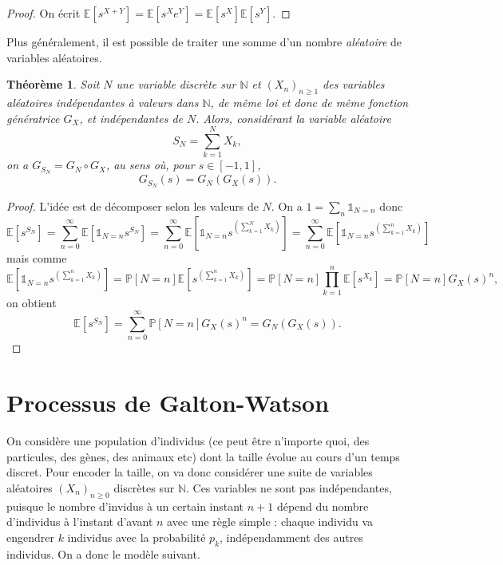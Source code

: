 \documentclass[a4paper,12pt]{book}
\newtheorem{thmfr}{Théorème}[section]
\begin{document}
\begin{proof}On écrit $\mathbb{E}[s^{X+Y}]=\mathbb{E}[s^Xe^Y]=\mathbb{E}[s^X]\mathbb{E}[s^Y]$.
\end{proof}
Plus généralement, il est possible de traiter une somme d'un nombre \emph{aléatoire} de variables aléatoires.
\begin{thmfr} Soit $N$ une variable discrète sur $\mathbb{N}$ et $(X_n)_{n\geq 1}$ des variables aléatoires indépendantes à valeurs dans $\mathbb{N}$, de même loi et donc de même fonction génératrice $G_X$, et indépendantes de $N$. Alors, considérant la variable aléatoire
$$S_N=\sum_{k=1}^NX_k,$$
on a $G_{S_N}=G_N\circ G_X$, au sens où, pour $s\in [-1,1]$,
$$G_{S_N}(s)=G_N( G_X(s)) .$$
\end{thmfr}
\begin{proof}L'idée est de décomposer selon les valeurs de $N$. On a $1=\sum_n \mathds{1}_{N=n}$ donc
$$\mathbb{E}[s^{S_N}]=\sum_{n=0}^\infty \mathbb{E}[\mathds{1}_{N=n}s^{S_N}] =\sum_{n=0}^\infty \mathbb{E}\left[\mathds{1}_{N=n}s^{\left(\sum_{k=1}^NX_k\right)}\right]=\sum_{n=0}^\infty \mathbb{E}\left[\mathds{1}_{N=n}s^{\left(\sum_{k=1}^nX_k\right)}\right]$$
mais comme
$$\mathbb{E}\left[\mathds{1}_{N=n}s^{\left(\sum_{k=1}^nX_k\right)}\right]=\mathbb{P}[N=n]\mathbb{E}\left[s^{\left(\sum_{k=1}^nX_k\right)}\right]=\mathbb{P}[N=n]\prod_{k=1}^n\mathbb{E}\left[s^{X_k}\right]=\mathbb{P}[N=n] G_X(s)^n,$$
on obtient
$$\mathbb{E}[s^{S_N}]=\sum_{n=0}^\infty\mathbb{P}[N=n] G_X(s)^n=G_N(G_X(s)).$$
\end{proof}


\section{Processus de Galton-Watson}

On considère une population d'individus (ce peut être n'importe quoi, des particules, des gènes, des animaux etc) dont la taille évolue au cours d'un temps discret. Pour encoder la taille, on va donc considérer une suite de variables aléatoires $(X_n)_{n\geq 0}$ discrètes sur $\mathbb{N}$. Ces variables ne sont pas indépendantes, puisque le nombre d'invidus à un certain instant $n+1$ dépend du nombre d'individus à l'instant d'avant $n$ avec une règle simple : chaque individu va engendrer $k$ individus avec la probabilité $p_k$, indépendamment des autres individus. On a donc le modèle suivant.
\end{document}
